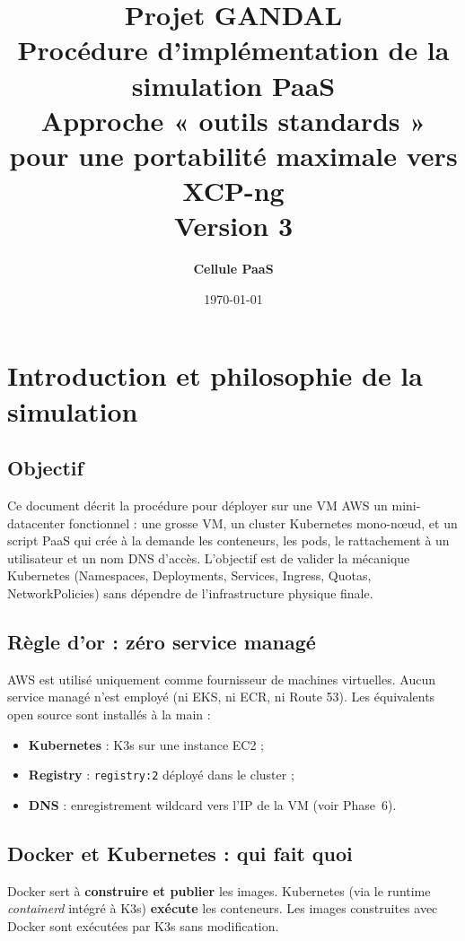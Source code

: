 \documentclass[12pt,a4paper]{article}
\title{
    \vspace{2cm}
    \textbf{\Huge Projet GANDAL} \\
    \vspace{0.5cm}
    \Large{Procédure d'implémentation de la simulation PaaS} \\
    \vspace{1cm}
    \large{Approche « outils standards » pour une portabilité maximale vers XCP-ng} \\
    \vspace{0.5cm}
    \normalsize{Version 3}
}
\author{\textbf{Cellule PaaS}}
\date{\today}
\begin{document}
\maketitle
\thispagestyle{empty}
\newpage

\tableofcontents
\newpage

\section{Introduction et philosophie de la simulation}

\subsection{Objectif}
Ce document décrit la procédure pour déployer sur une VM AWS un mini-datacenter fonctionnel : une grosse VM, un cluster Kubernetes mono-nœud, et un script PaaS qui crée à la demande les conteneurs, les pods, le rattachement à un utilisateur et un nom DNS d'accès. L'objectif est de valider la mécanique Kubernetes (Namespaces, Deployments, Services, Ingress, Quotas, NetworkPolicies) sans dépendre de l'infrastructure physique finale.

\subsection{Règle d'or : zéro service managé}
AWS est utilisé uniquement comme fournisseur de machines virtuelles. Aucun service managé n'est employé (ni EKS, ni ECR, ni Route 53). Les équivalents open source sont installés à la main :
\begin{itemize}
    \item \textbf{Kubernetes} : K3s sur une instance EC2 ;
    \item \textbf{Registry} : \nolinkurl{registry:2} déployé dans le cluster ;
    \item \textbf{DNS} : enregistrement wildcard vers l'IP de la VM (voir Phase~6).
\end{itemize}

\subsection{Docker et Kubernetes : qui fait quoi}
Docker sert à \textbf{construire et publier} les images. Kubernetes (via le runtime \textit{containerd} intégré à K3s) \textbf{exécute} les conteneurs. Les images construites avec Docker sont exécutées par K3s sans modification.
\end{document}
